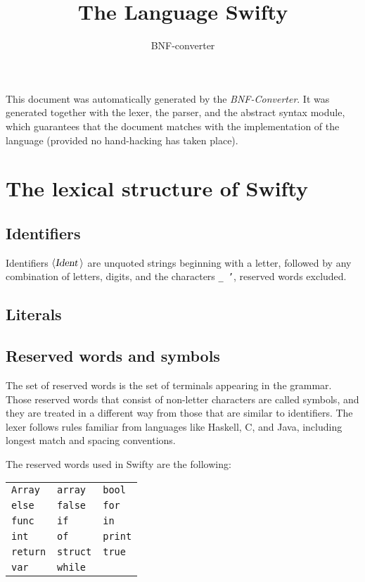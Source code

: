 \documentclass[a4paper,11pt]{article}
\author{BNF-converter}
\title{The Language Swifty}
\begin{document}
\maketitle

\newcommand{\emptyP}{\mbox{$\epsilon$}}
\newcommand{\terminal}[1]{\mbox{{\texttt {#1}}}}
\newcommand{\nonterminal}[1]{\mbox{$\langle \mbox{{\sl #1 }} \! \rangle$}}
\newcommand{\arrow}{\mbox{::=}}
\newcommand{\delimit}{\mbox{$|$}}
\newcommand{\reserved}[1]{\mbox{{\texttt {#1}}}}
\newcommand{\literal}[1]{\mbox{{\texttt {#1}}}}
\newcommand{\symb}[1]{\mbox{{\texttt {#1}}}}

This document was automatically generated by the {\em BNF-Converter}. It was generated together with the lexer, the parser, and the abstract syntax module, which guarantees that the document matches with the implementation of the language (provided no hand-hacking has taken place).

\section*{The lexical structure of Swifty}
\subsection*{Identifiers}
Identifiers \nonterminal{Ident} are unquoted strings beginning with a letter,
followed by any combination of letters, digits, and the characters {\tt \_ '},
reserved words excluded.


\subsection*{Literals}




\subsection*{Reserved words and symbols}
The set of reserved words is the set of terminals appearing in the grammar. Those reserved words that consist of non-letter characters are called symbols, and they are treated in a different way from those that are similar to identifiers. The lexer follows rules familiar from languages like Haskell, C, and Java, including longest match and spacing conventions.

The reserved words used in Swifty are the following: \\

\begin{tabular}{lll}
{\reserved{Array}} &{\reserved{array}} &{\reserved{bool}} \\
{\reserved{else}} &{\reserved{false}} &{\reserved{for}} \\
{\reserved{func}} &{\reserved{if}} &{\reserved{in}} \\
{\reserved{int}} &{\reserved{of}} &{\reserved{print}} \\
{\reserved{return}} &{\reserved{struct}} &{\reserved{true}} \\
{\reserved{var}} &{\reserved{while}} & \\
\end{tabular}\\
\end{document}
